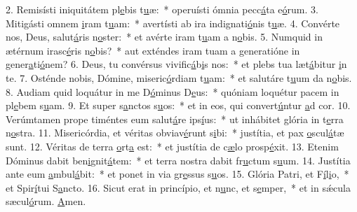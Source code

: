 2. Remisísti iniquitátem pl\uline{e}bis t\uline{u}æ:~* operuísti ómnia pecc\uline{á}ta e\uline{ó}rum.
3. Mitigásti omnem \uline{i}ram t\uline{u}am:~* avertísti ab ira indignati\uline{ó}nis t\uline{u}æ.
4. Convérte nos, Deus, salut\uline{á}ris n\uline{o}ster:~* et avérte iram t\uline{u}am a n\uline{o}bis.
5. Numquid in ætérnum irasc\uline{é}ris n\uline{o}bis?~* aut exténdes iram tuam a generatióne in gener\uline{a}ti\uline{ó}nem?
6. Deus, tu convérsus vivific\uline{á}b\uline{i}s nos:~* et plebs tua læt\uline{á}bitur \uline{i}n te.
7. Osténde nobis, Dómine, miseric\uline{ó}rdiam t\uline{u}am:~* et salutáre t\uline{u}um da n\uline{o}bis.
8. Audiam quid loquátur in me D\uline{ó}minus D\uline{e}us:~* quóniam loquétur pacem in pl\uline{e}bem s\uline{u}am.
9. Et super s\uline{a}nctos s\uline{u}os:~* et in eos, qui convert\uline{ú}ntur \uline{a}d cor.
10. Verúmtamen prope timéntes eum salut\uline{á}re ips\uline{í}us:~* ut inhábitet glória in t\uline{e}rra n\uline{o}stra.
11. Misericórdia, et véritas obviav\uline{é}runt s\uline{i}bi:~* justítia, et pax \uline{o}scul\uline{á}tæ sunt.
12. Véritas de terra \uline{o}rt\uline{a} est:~* et justítia de c\uline{æ}lo prosp\uline{é}xit.
13. Etenim Dóminus dabit ben\uline{i}gnit\uline{á}tem:~* et terra nostra dabit fr\uline{u}ctum s\uline{u}um.
14. Justítia ante eum \uline{a}mbul\uline{á}bit:~* et ponet in via gr\uline{e}ssus s\uline{u}os.
15. Glória Patri, et F\uline{í}l\uline{i}o,~* et Spir\uline{í}tui S\uline{a}ncto.
16. Sicut erat in princípio, et n\uline{u}nc, et s\uline{e}mper,~* et in sǽcula sæcul\uline{ó}rum. \uline{A}men.
